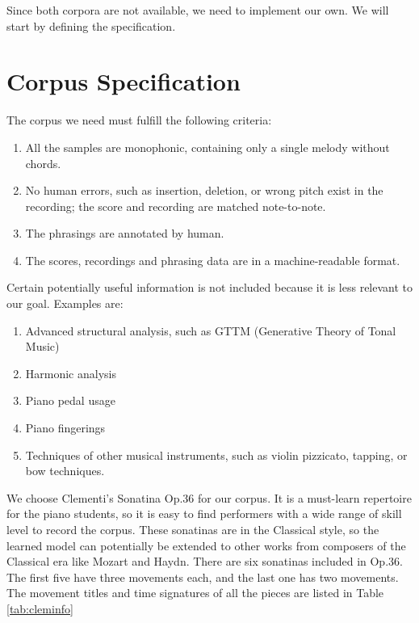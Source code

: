 Since both corpora are not available, we need to implement our own. We will start by defining the specification.

\section{Corpus Specification}

The corpus we need must fulfill the following criteria:
\begin{enumerate}
   \item All the samples are monophonic, containing only a single melody without chords.
   \item No human errors, such as insertion, deletion, or wrong pitch exist in the recording; the score and recording are matched note-to-note.
   \item The phrasings are annotated by human. 
   \item The scores, recordings and phrasing data are in a machine-readable format.

\end{enumerate}

Certain potentially useful information is not included because it is less relevant to our goal. Examples are:

\begin{enumerate}
   \item Advanced structural analysis, such as GTTM (Generative Theory of Tonal Music)\cite{GTTM}
   \item Harmonic analysis
   \item Piano pedal usage
   \item Piano fingerings
   \item Techniques of other musical instruments, such as violin pizzicato, tapping, or bow techniques.
\end{enumerate}

We choose Clementi's Sonatina Op.36 for our corpus. It is a must-learn repertoire for the piano students, so it is easy to find performers with a wide range of skill level to record the corpus. These sonatinas are in the Classical style, so the learned model can potentially be extended to other works from composers of the Classical era like Mozart and Haydn. There are six sonatinas included in Op.36. The first five have three movements each, and the last one has two movements. The movement titles and time signatures of all the pieces are listed in Table \ref{tab:cleminfo}


